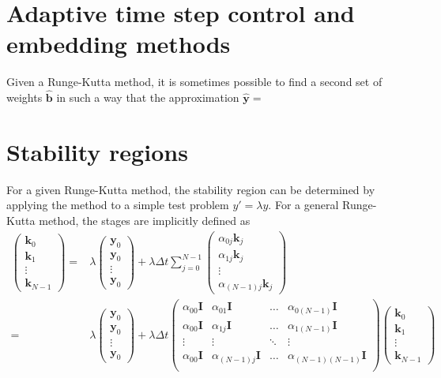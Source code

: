 \documentclass[10pt,a4paper]{article}
\newcommand{\bvec}[1]{\mathbf{#1}}
\begin{document}
\section{Adaptive time step control and embedding methods}

Given a Runge-Kutta method, it is sometimes possible to find a second set of weights $\hat{\bvec{b}}$ in such a way that the approximation $\hat{\bvec{y}} = $

\section{Stability regions}

For a given Runge-Kutta method, the stability region can be determined by applying the method to a
simple test problem $y' = \lambda y.$
For a general Runge-Kutta method, the stages are implicitly defined as
\begin{align*}
  \begin{pmatrix} \bvec{k}_0 \\
    \bvec{k}_1 \\
    \vdots \\
    \bvec{k}_{N-1} 
  \end{pmatrix}
  =& \lambda \begin{pmatrix} \bvec{y}_0 \\
    \bvec{y}_0 \\
    \vdots \\
    \bvec{y}_0
  \end{pmatrix}
  + \lambda \Delta t \sum_{j=0}^{N-1} \begin{pmatrix}
    \alpha_{0j}\bvec{k}_j \\
    \alpha_{1j}\bvec{k}_j \\
    \vdots \\
    \alpha_{(N-1)j}\bvec{k}_j
  \end{pmatrix} \\
  =& \lambda \begin{pmatrix} \bvec{y}_0 \\
    \bvec{y}_0 \\
    \vdots \\
    \bvec{y}_0
  \end{pmatrix} + \lambda \Delta t \begin{pmatrix}
    \alpha_{00}\bvec{I} &\alpha_{01}\bvec{I} &\hdots &\alpha_{0(N-1)}\bvec{I} \\
    \alpha_{00}\bvec{I} &\alpha_{1j}\bvec{I} &\hdots &\alpha_{1(N-1)}\bvec{I} \\
    \vdots & \vdots & \ddots & \vdots \\
    \alpha_{00}\bvec{I} &\alpha_{(N-1)j}\bvec{I} &\hdots &\alpha_{(N-1)(N-1)}\bvec{I} \\
  \end{pmatrix} \begin{pmatrix}
    \bvec{k}_0 \\
    \bvec{k}_1 \\
    \vdots \\
    \bvec{k}_{N-1} 
  \end{pmatrix}
\end{align*}
\end{document}
